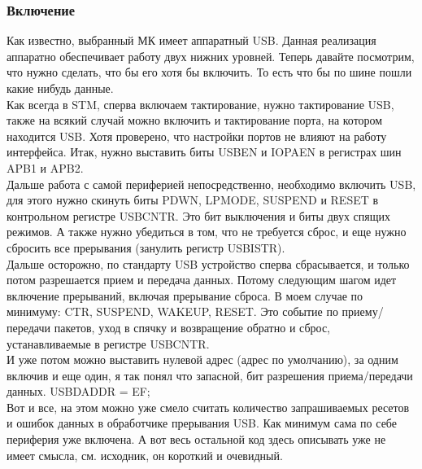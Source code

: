 \documentclass[12pt,a4paper]{article}
\begin{document}
\subsubsection{Включение}
    Как известно, выбранный МК имеет аппаратный USB. Данная реализация аппаратно
    обеспечивает работу двух нижних уровней. Теперь давайте посмотрим,
    что нужно сделать, что бы его хотя бы включить. То есть что бы по шине пошли
    какие нибудь данные.\\
    Как всегда в STM, сперва включаем тактирование, нужно тактирование USB,
    также на всякий случай можно включить и тактирование порта, на котором
    находится USB. Хотя проверено, что настройки портов не влияют на работу
    интерфейса. Итак, нужно выставить биты USBEN и IOPAEN в регистрах шин APB1 и APB2.\\
    Дальше работа с самой периферией непосредственно, необходимо включить USB,
    для этого нужно скинуть биты PDWN, LPMODE, SUSPEND и RESET в контрольном
    регистре USB\textunderscore CNTR. Это бит выключения и биты двух спящих режимов.
    А также нужно убедиться в том, что не требуется сброс, и еще нужно сбросить все
    прерывания (занулить регистр USB\textunderscore ISTR).\\
    Дальше осторожно, по стандарту USB устройство сперва
    сбрасывается, и только потом разрешается прием и передача данных. Потому
    следующим шагом идет включение прерываний, включая прерывание сброса.
    В моем случае по минимуму: CTR, SUSPEND,
    WAKEUP, RESET. Это событие по приему/передачи пакетов, уход в спячку и
    возвращение обратно и сброс, устанавливаемые в регистре USB\textunderscore CNTR.\\
    И уже потом можно выставить нулевой адрес (адрес по умолчанию), за одним
    включив и еще один, я так понял что запасной, бит разрешения приема/передачи
    данных. USB\textunderscore DADDR = EF;\\
    Вот и все, на этом можно уже смело считать количество запрашиваемых
    ресетов и ошибок данных в обработчике прерывания USB.
    Как минимум сама по себе периферия уже включена. А вот весь остальной код
    здесь описывать уже не имеет смысла, см. исходник, он короткий и очевидный.
\end{document}
